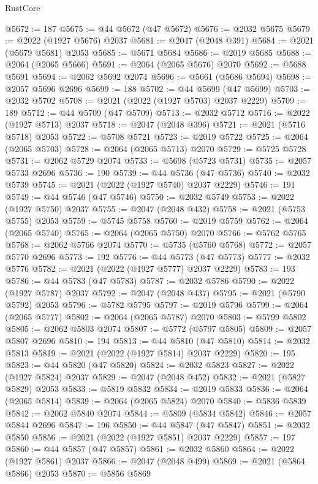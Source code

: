 \begin{lexlean}{RustCore}
\begin{coremodule}
@5672 := 187
@5675 := @44 @5672 (@47 @5672)
@5676 := @2032 @5675
@5679 := @2022 (@1927 @5676) @2037
@5681 := @2047 (@2048 @391)
@5684 := @2021 (@5679 @5681) @2053
@5685 := @5671 @5684
@5686 := @2019 @5685
@5688 := @2064 (@2065 @5666)
@5691 := @2064 (@2065 @5676) @2070
@5692 := @5688 @5691
@5694 := @2062 @5692 @2074
@5696 := @5661 (@5686 @5694)
@5698 := @2057 @5696 @2696
@5699 := 188
@5702 := @44 @5699 (@47 @5699)
@5703 := @2032 @5702
@5708 := @2021 (@2022 (@1927 @5703) @2037 @2229)
@5709 := 189
@5712 := @44 @5709 (@47 @5709)
@5713 := @2032 @5712
@5716 := @2022 (@1927 @5713) @2037
@5718 := @2047 (@2048 @396)
@5721 := @2021 (@5716 @5718) @2053
@5722 := @5708 @5721
@5723 := @2019 @5722
@5725 := @2064 (@2065 @5703)
@5728 := @2064 (@2065 @5713) @2070
@5729 := @5725 @5728
@5731 := @2062 @5729 @2074
@5733 := @5698 (@5723 @5731)
@5735 := @2057 @5733 @2696
@5736 := 190
@5739 := @44 @5736 (@47 @5736)
@5740 := @2032 @5739
@5745 := @2021 (@2022 (@1927 @5740) @2037 @2229)
@5746 := 191
@5749 := @44 @5746 (@47 @5746)
@5750 := @2032 @5749
@5753 := @2022 (@1927 @5750) @2037
@5755 := @2047 (@2048 @432)
@5758 := @2021 (@5753 @5755) @2053
@5759 := @5745 @5758
@5760 := @2019 @5759
@5762 := @2064 (@2065 @5740)
@5765 := @2064 (@2065 @5750) @2070
@5766 := @5762 @5765
@5768 := @2062 @5766 @2074
@5770 := @5735 (@5760 @5768)
@5772 := @2057 @5770 @2696
@5773 := 192
@5776 := @44 @5773 (@47 @5773)
@5777 := @2032 @5776
@5782 := @2021 (@2022 (@1927 @5777) @2037 @2229)
@5783 := 193
@5786 := @44 @5783 (@47 @5783)
@5787 := @2032 @5786
@5790 := @2022 (@1927 @5787) @2037
@5792 := @2047 (@2048 @437)
@5795 := @2021 (@5790 @5792) @2053
@5796 := @5782 @5795
@5797 := @2019 @5796
@5799 := @2064 (@2065 @5777)
@5802 := @2064 (@2065 @5787) @2070
@5803 := @5799 @5802
@5805 := @2062 @5803 @2074
@5807 := @5772 (@5797 @5805)
@5809 := @2057 @5807 @2696
@5810 := 194
@5813 := @44 @5810 (@47 @5810)
@5814 := @2032 @5813
@5819 := @2021 (@2022 (@1927 @5814) @2037 @2229)
@5820 := 195
@5823 := @44 @5820 (@47 @5820)
@5824 := @2032 @5823
@5827 := @2022 (@1927 @5824) @2037
@5829 := @2047 (@2048 @452)
@5832 := @2021 (@5827 @5829) @2053
@5833 := @5819 @5832
@5834 := @2019 @5833
@5836 := @2064 (@2065 @5814)
@5839 := @2064 (@2065 @5824) @2070
@5840 := @5836 @5839
@5842 := @2062 @5840 @2074
@5844 := @5809 (@5834 @5842)
@5846 := @2057 @5844 @2696
@5847 := 196
@5850 := @44 @5847 (@47 @5847)
@5851 := @2032 @5850
@5856 := @2021 (@2022 (@1927 @5851) @2037 @2229)
@5857 := 197
@5860 := @44 @5857 (@47 @5857)
@5861 := @2032 @5860
@5864 := @2022 (@1927 @5861) @2037
@5866 := @2047 (@2048 @499)
@5869 := @2021 (@5864 @5866) @2053
@5870 := @5856 @5869

\end{coremodule}
\end{lexlean}
